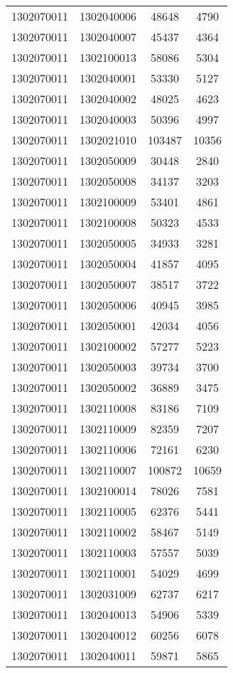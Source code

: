 \begin{longtable}[h]{llcc}
		1302070011 & 1302040006 & 48648 & 4790\\
		1302070011 & 1302040007 & 45437 & 4364\\
		1302070011 & 1302100013 & 58086 & 5304\\
		1302070011 & 1302040001 & 53330 & 5127\\
		1302070011 & 1302040002 & 48025 & 4623\\
		1302070011 & 1302040003 & 50396 & 4997\\
		1302070011 & 1302021010 & 103487 & 10356\\
		1302070011 & 1302050009 & 30448 & 2840\\
		1302070011 & 1302050008 & 34137 & 3203\\
		1302070011 & 1302100009 & 53401 & 4861\\
		1302070011 & 1302100008 & 50323 & 4533\\
		1302070011 & 1302050005 & 34933 & 3281\\
		1302070011 & 1302050004 & 41857 & 4095\\
		1302070011 & 1302050007 & 38517 & 3722\\
		1302070011 & 1302050006 & 40945 & 3985\\
		1302070011 & 1302050001 & 42034 & 4056\\
		1302070011 & 1302100002 & 57277 & 5223\\
		1302070011 & 1302050003 & 39734 & 3700\\
		1302070011 & 1302050002 & 36889 & 3475\\
		1302070011 & 1302110008 & 83186 & 7109\\
		1302070011 & 1302110009 & 82359 & 7207\\
		1302070011 & 1302110006 & 72161 & 6230\\
		1302070011 & 1302110007 & 100872 & 10659\\
		1302070011 & 1302100014 & 78026 & 7581\\
		1302070011 & 1302110005 & 62376 & 5441\\
		1302070011 & 1302110002 & 58467 & 5149\\
		1302070011 & 1302110003 & 57557 & 5039\\
		1302070011 & 1302110001 & 54029 & 4699\\
		1302070011 & 1302031009 & 62737 & 6217\\
		1302070011 & 1302040013 & 54906 & 5339\\
		1302070011 & 1302040012 & 60256 & 6078\\
		1302070011 & 1302040011 & 59871 & 5865\\

\end{longtable}
